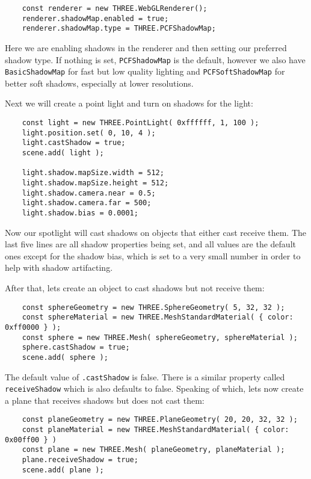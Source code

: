 \documentclass[10pt,final,journal,compsoc]{IEEEtran}
\begin{document}
        \begin{lstlisting}
    const renderer = new THREE.WebGLRenderer();
    renderer.shadowMap.enabled = true;
    renderer.shadowMap.type = THREE.PCFShadowMap;
        \end{lstlisting}
        
        Here we are enabling shadows in the renderer and then setting our preferred shadow type. If nothing is set, \verb|PCFShadowMap| is the default, however we also have \verb|BasicShadowMap| for fast but low quality lighting and \verb|PCFSoftShadowMap| for better soft shadows, especially at lower resolutions.
        
        Next we will create a point light and turn on shadows for the light:
        
        \begin{lstlisting}
    const light = new THREE.PointLight( 0xffffff, 1, 100 );
    light.position.set( 0, 10, 4 );
    light.castShadow = true;
    scene.add( light );
        
    light.shadow.mapSize.width = 512;
    light.shadow.mapSize.height = 512;
    light.shadow.camera.near = 0.5;
    light.shadow.camera.far = 500;
    light.shadow.bias = 0.0001;
        \end{lstlisting}
        
        Now our spotlight will cast shadows on objects that either cast receive them. The last five lines are all shadow properties being set, and all values are the default ones except for the shadow bias, which is set to a very small number in order to help with shadow artifacting.
        
        After that, lets create an object to cast shadows but not receive them:
        
        \begin{lstlisting}
    const sphereGeometry = new THREE.SphereGeometry( 5, 32, 32 );
    const sphereMaterial = new THREE.MeshStandardMaterial( { color: 0xff0000 } );
    const sphere = new THREE.Mesh( sphereGeometry, sphereMaterial );
    sphere.castShadow = true;
    scene.add( sphere );
        \end{lstlisting}
        
        The default value of \verb|.castShadow| is false. There is a similar property called \verb|receiveShadow| which is also defaults to false. Speaking of which, lets now create a plane that receives shadows but does not cast them:
        
        \begin{lstlisting}
    const planeGeometry = new THREE.PlaneGeometry( 20, 20, 32, 32 );
    const planeMaterial = new THREE.MeshStandardMaterial( { color: 0x00ff00 } )
    const plane = new THREE.Mesh( planeGeometry, planeMaterial );
    plane.receiveShadow = true;
    scene.add( plane );
        \end{lstlisting}
        
\end{document}

